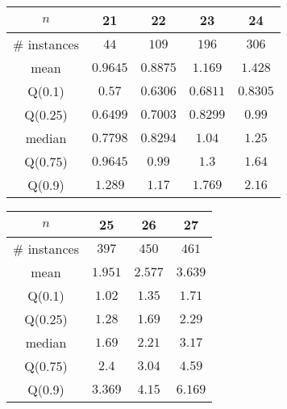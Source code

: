 \begin{tabular}{c|cccc} 
\hline 
$n$ & 21 & 22 & 23 & 24 \tabularnewline 
\hline 
\hline 
\# instances & $44$ & $109$ & $196$ & $306$ \tabularnewline 
mean & $0.9645$ & $0.8875$ & $1.169$ & $1.428$ \tabularnewline 
Q(0.1) & $0.57$ & $0.6306$ & $0.6811$ & $0.8305$ \tabularnewline 
Q(0.25) & $0.6499$ & $0.7003$ & $0.8299$ & $0.99$ \tabularnewline 
median & $0.7798$ & $0.8294$ & $1.04$ & $1.25$ \tabularnewline 
Q(0.75) & $0.9645$ & $0.99$ & $1.3$ & $1.64$ \tabularnewline 
Q(0.9) & $1.289$ & $1.17$ & $1.769$ & $2.16$ \tabularnewline 
\hline 
\end{tabular} 
\medskip{} 

\begin{tabular}{c|ccc} 
\hline 
$n$ & 25 & 26 & 27 \tabularnewline 
\hline 
\hline 
\# instances & $397$ & $450$ & $461$ \tabularnewline 
mean & $1.951$ & $2.577$ & $3.639$ \tabularnewline 
Q(0.1) & $1.02$ & $1.35$ & $1.71$ \tabularnewline 
Q(0.25) & $1.28$ & $1.69$ & $2.29$ \tabularnewline 
median & $1.69$ & $2.21$ & $3.17$ \tabularnewline 
Q(0.75) & $2.4$ & $3.04$ & $4.59$ \tabularnewline 
Q(0.9) & $3.369$ & $4.15$ & $6.169$ \tabularnewline 
\hline 
\end{tabular} 
\medskip{} 

